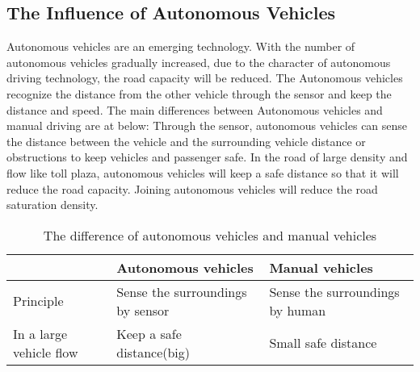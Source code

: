 \documentclass{mcmthesis}
\begin{document}
\subsection{The Influence of Autonomous Vehicles}
Autonomous vehicles are an emerging technology. With the number of autonomous vehicles gradually increased, due to the character of autonomous driving technology, the road capacity will be reduced. The Autonomous vehicles recognize the distance from the other vehicle through the sensor and keep the distance and speed. The main differences between Autonomous vehicles and manual driving are at below: Through the sensor, autonomous vehicles can sense the distance between the vehicle and the surrounding vehicle distance or obstructions to keep vehicles and passenger safe. In the road of large density and flow like toll plaza, autonomous vehicles will keep a safe distance so that it will reduce the road capacity. Joining autonomous vehicles will reduce the road saturation density.
\begin{table}
	\centering
	\caption{\label{tab:test}The difference of autonomous vehicles and manual vehicles}
	\begin{tabular}{p{3cm}p{5cm}p{5cm}}
		\toprule
		& Autonomous vehicles & Manual vehicles\\ 
		\midrule
		Principle& Sense the surroundings by sensor& Sense the surroundings by human  \\ 
		In a large vehicle flow& Keep a safe distance(big)&Small safe distance \\
		\bottomrule
	\end{tabular} 
	
\end{table}
\end{document}
